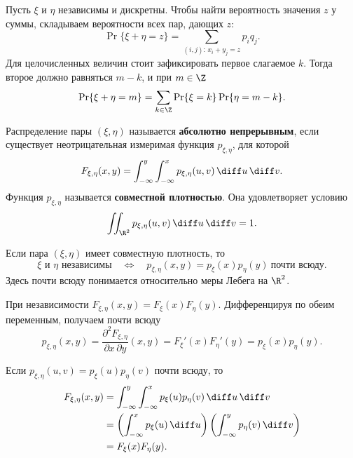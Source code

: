 \begin{theorem}
Пусть $\xi$ и $\eta$ независимы и дискретны. Чтобы найти вероятность
значения $z$ у суммы, складываем вероятности всех пар, дающих $z$:
\[
 \Pr\{\xi+\eta=z\}=\sum_{(i,j):\,x_i+y_j=z}p_iq_j.
\]
Для целочисленных величин стоит зафиксировать первое слагаемое $k$.
Тогда второе должно равняться $m-k$, и при $m\in\Z$
\[
 \Pr\{\xi+\eta=m\}
 =\sum_{k\in\Z}\Pr\{\xi=k\}\Pr\{\eta=m-k\}.
\]
\end{theorem}


\begin{definition}
    Распределение пары $(\xi,\eta)$ называется \textbf{абсолютно непрерывным},
    если существует неотрицательная измеримая функция $p_{\xi,\eta}$,
    для которой
    \[
        F_{\xi,\eta}(x,y)
        =\int_{-\infty}^{y}\int_{-\infty}^{x}
            p_{\xi,\eta}(u,v)\,\diff u\,\diff v.
    \]
    Функция $p_{\xi,\eta}$ называется \textbf{совместной плотностью}.
    Она удовлетворяет условию
    \[
        \iint_{\R^2}p_{\xi,\eta}(u,v)\,\diff u\,\diff v=1.
    \]
\end{definition}

\begin{theorem}
    Если пара $(\xi,\eta)$ имеет совместную плотность, то
    \[
        \xi\text{ и }\eta\text{ независимы}
        \quad\Longleftrightarrow\quad
        p_{\xi,\eta}(x,y)=p_\xi(x)p_\eta(y)
        \ \text{почти всюду}.
    \]
    Здесь почти всюду понимается относительно меры Лебега на $\R^2$.
\end{theorem}

\begin{Proof}
    При независимости $F_{\xi,\eta}(x,y)=F_\xi(x)F_\eta(y)$.
    Дифференцируя по обеим переменным, получаем почти всюду
    \[
        p_{\xi,\eta}(x,y)
        =\frac{\partial^2F_{\xi,\eta}}{\partial x\,\partial y}(x,y)
        =F_\xi'(x)F_\eta'(y)=p_\xi(x)p_\eta(y).
    \]
\end{Proof}

\begin{Proof}
    Если $p_{\xi,\eta}(u,v)=p_\xi(u)p_\eta(v)$ почти всюду, то
    \[
        \begin{aligned}
            F_{\xi,\eta}(x,y)
            &=\int_{-\infty}^{y}\int_{-\infty}^{x}
                p_\xi(u)p_\eta(v)\,\diff u\,\diff v\\
            &=\left(\int_{-\infty}^{x}p_\xi(u)\,\diff u\right)
              \left(\int_{-\infty}^{y}p_\eta(v)\,\diff v\right)\\
            &=F_\xi(x)F_\eta(y).
        \end{aligned}
    \]
\end{Proof}


